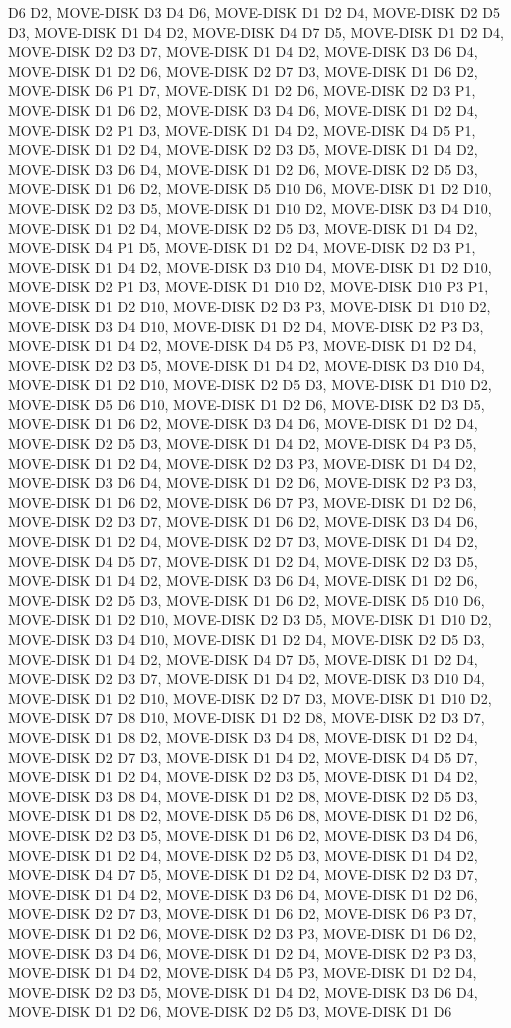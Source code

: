 \documentclass[12pt]{article}
\begin{document}
\begin{appendix}
\begin{itemize}
D6 D2,  MOVE-DISK D3 D4 D6,  MOVE-DISK D1 D2 D4,  MOVE-DISK D2 D5 D3,  MOVE-DISK D1 D4 D2,  MOVE-DISK D4 D7 D5,  MOVE-DISK D1 D2 D4,  MOVE-DISK D2 D3 D7,  MOVE-DISK D1 D4 D2,  MOVE-DISK D3 D6 D4,  MOVE-DISK D1 D2 D6,  MOVE-DISK D2 D7 D3,  MOVE-DISK D1 D6 D2,  MOVE-DISK D6 P1 D7,  MOVE-DISK D1 D2 D6,  MOVE-DISK D2 D3 P1,  MOVE-DISK D1 D6 D2,  MOVE-DISK D3 D4 D6,  MOVE-DISK D1 D2 D4,  MOVE-DISK D2 P1 D3,  MOVE-DISK D1 D4 D2,  MOVE-DISK D4 D5 P1,  MOVE-DISK D1 D2 D4,  MOVE-DISK D2 D3 D5,  MOVE-DISK D1 D4 D2,  MOVE-DISK D3 D6 D4,  MOVE-DISK D1 D2 D6,  MOVE-DISK D2 D5 D3,  MOVE-DISK D1 D6 D2,  MOVE-DISK D5 D10 D6,  MOVE-DISK D1 D2 D10,  MOVE-DISK D2 D3 D5,  MOVE-DISK D1 D10 D2,  MOVE-DISK D3 D4 D10,  MOVE-DISK D1 D2 D4,  MOVE-DISK D2 D5 D3,  MOVE-DISK D1 D4 D2,  MOVE-DISK D4 P1 D5,  MOVE-DISK D1 D2 D4,  MOVE-DISK D2 D3 P1,  MOVE-DISK D1 D4 D2,  MOVE-DISK D3 D10 D4,  MOVE-DISK D1 D2 D10,  MOVE-DISK D2 P1 D3,  MOVE-DISK D1 D10 D2,  MOVE-DISK D10 P3 P1,  MOVE-DISK D1 D2 D10,  MOVE-DISK D2 D3 P3,  MOVE-DISK D1 D10 D2,  MOVE-DISK D3 D4 D10,  MOVE-DISK D1 D2 D4,  MOVE-DISK D2 P3 D3,  MOVE-DISK D1 D4 D2,  MOVE-DISK D4 D5 P3,  MOVE-DISK D1 D2 D4,  MOVE-DISK D2 D3 D5,  MOVE-DISK D1 D4 D2,  MOVE-DISK D3 D10 D4,  MOVE-DISK D1 D2 D10,  MOVE-DISK D2 D5 D3,  MOVE-DISK D1 D10 D2,  MOVE-DISK D5 D6 D10,  MOVE-DISK D1 D2 D6,  MOVE-DISK D2 D3 D5,  MOVE-DISK D1 D6 D2,  MOVE-DISK D3 D4 D6,  MOVE-DISK D1 D2 D4,  MOVE-DISK D2 D5 D3,  MOVE-DISK D1 D4 D2,  MOVE-DISK D4 P3 D5,  MOVE-DISK D1 D2 D4,  MOVE-DISK D2 D3 P3,  MOVE-DISK D1 D4 D2,  MOVE-DISK D3 D6 D4,  MOVE-DISK D1 D2 D6,  MOVE-DISK D2 P3 D3,  MOVE-DISK D1 D6 D2,  MOVE-DISK D6 D7 P3,  MOVE-DISK D1 D2 D6,  MOVE-DISK D2 D3 D7,  MOVE-DISK D1 D6 D2,  MOVE-DISK D3 D4 D6,  MOVE-DISK D1 D2 D4,  MOVE-DISK D2 D7 D3,  MOVE-DISK D1 D4 D2,  MOVE-DISK D4 D5 D7,  MOVE-DISK D1 D2 D4,  MOVE-DISK D2 D3 D5,  MOVE-DISK D1 D4 D2,  MOVE-DISK D3 D6 D4,  MOVE-DISK D1 D2 D6,  MOVE-DISK D2 D5 D3,  MOVE-DISK D1 D6 D2,  MOVE-DISK D5 D10 D6,  MOVE-DISK D1 D2 D10,  MOVE-DISK D2 D3 D5,  MOVE-DISK D1 D10 D2,  MOVE-DISK D3 D4 D10,  MOVE-DISK D1 D2 D4,  MOVE-DISK D2 D5 D3,  MOVE-DISK D1 D4 D2,  MOVE-DISK D4 D7 D5,  MOVE-DISK D1 D2 D4,  MOVE-DISK D2 D3 D7,  MOVE-DISK D1 D4 D2,  MOVE-DISK D3 D10 D4,  MOVE-DISK D1 D2 D10,  MOVE-DISK D2 D7 D3,  MOVE-DISK D1 D10 D2,  MOVE-DISK D7 D8 D10,  MOVE-DISK D1 D2 D8,  MOVE-DISK D2 D3 D7,  MOVE-DISK D1 D8 D2,  MOVE-DISK D3 D4 D8,  MOVE-DISK D1 D2 D4,  MOVE-DISK D2 D7 D3,  MOVE-DISK D1 D4 D2,  MOVE-DISK D4 D5 D7,  MOVE-DISK D1 D2 D4,  MOVE-DISK D2 D3 D5,  MOVE-DISK D1 D4 D2,  MOVE-DISK D3 D8 D4,  MOVE-DISK D1 D2 D8,  MOVE-DISK D2 D5 D3,  MOVE-DISK D1 D8 D2,  MOVE-DISK D5 D6 D8,  MOVE-DISK D1 D2 D6,  MOVE-DISK D2 D3 D5,  MOVE-DISK D1 D6 D2,  MOVE-DISK D3 D4 D6,  MOVE-DISK D1 D2 D4,  MOVE-DISK D2 D5 D3,  MOVE-DISK D1 D4 D2,  MOVE-DISK D4 D7 D5,  MOVE-DISK D1 D2 D4,  MOVE-DISK D2 D3 D7,  MOVE-DISK D1 D4 D2,  MOVE-DISK D3 D6 D4,  MOVE-DISK D1 D2 D6,  MOVE-DISK D2 D7 D3,  MOVE-DISK D1 D6 D2,  MOVE-DISK D6 P3 D7,  MOVE-DISK D1 D2 D6,  MOVE-DISK D2 D3 P3,  MOVE-DISK D1 D6 D2,  MOVE-DISK D3 D4 D6,  MOVE-DISK D1 D2 D4,  MOVE-DISK D2 P3 D3,  MOVE-DISK D1 D4 D2,  MOVE-DISK D4 D5 P3,  MOVE-DISK D1 D2 D4,  MOVE-DISK D2 D3 D5,  MOVE-DISK D1 D4 D2,  MOVE-DISK D3 D6 D4,  MOVE-DISK D1 D2 D6,  MOVE-DISK D2 D5 D3,  MOVE-DISK D1 D6 
\end{itemize}
\end{appendix}
\end{document}
